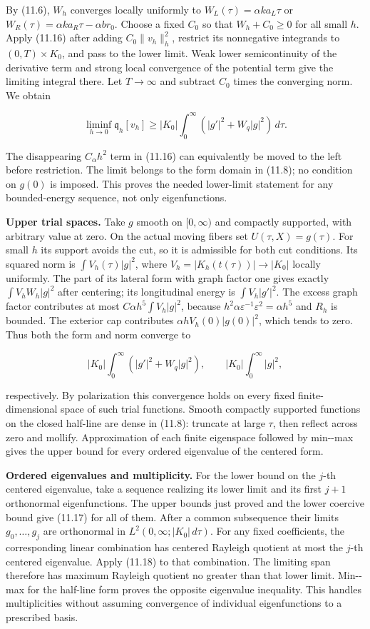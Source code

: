 \documentclass[11pt]{article}
\begin{document}
By (11.6), \(W_h\) converges locally uniformly to
\(W_L(\tau)=\alpha k a_L\tau\) or
\(W_R(\tau)=\alpha k a_R\tau-\alpha br_0\). Choose a fixed \(C_0\) so
that \(W_h+C_0\ge0\) for all small \(h\). Apply (11.16) after adding
\(C_0\|v_h\|_h^2\), restrict its nonnegative integrands to
\((0,T)\times K_0\), and pass to the lower limit. Weak lower
semicontinuity of the derivative term and strong local convergence of
the potential term give the limiting integral there. Let \(T\to\infty\)
and subtract \(C_0\) times the converging norm. We obtain

\[
\liminf_{h\to0}\mathfrak q_h[v_h]
\ge |K_0|\int_0^\infty(|g'|^2+W_q|g|^2)\,d\tau.
\tag{11.18}
\]

The disappearing \(C_\alpha h^2\) term in (11.16) can equivalently be
moved to the left before restriction. The limit belongs to the form
domain in (11.8); no condition on \(g(0)\) is imposed. This proves the
needed lower-limit statement for any bounded-energy sequence, not only
eigenfunctions.

\textbf{Upper trial spaces.} Take \(g\) smooth on \([0,\infty)\) and
compactly supported, with arbitrary value at zero. On the actual moving
fibers set \(U(\tau,X)=g(\tau)\). For small \(h\) its support avoids the
cut, so it is admissible for both cut conditions. Its squared norm is
\(\int V_h(\tau)|g|^2\), where \(V_h=|K_h(t(\tau))|\to|K_0|\) locally
uniformly. The part of its lateral form with graph factor one gives
exactly \(\int V_h W_h|g|^2\) after centering; its longitudinal energy
is \(\int V_h|g'|^2\). The excess graph factor contributes at most
\(C\alpha h^5\int V_h|g|^2\), because
\(h^2\alpha\varepsilon^{-1}\varepsilon^2=\alpha h^5\) and \(R_h\) is
bounded. The exterior cap contributes \(\alpha h V_h(0)|g(0)|^2\), which
tends to zero. Thus both the form and norm converge to

\[
|K_0|\int_0^\infty(|g'|^2+W_q|g|^2),
\qquad |K_0|\int_0^\infty|g|^2,
\tag{11.19}
\]

respectively. By polarization this convergence holds on every fixed
finite-dimensional space of such trial functions. Smooth compactly
supported functions on the closed half-line are dense in (11.8):
truncate at large \(\tau\), then reflect across zero and mollify.
Approximation of each finite eigenspace followed by min-\/-max gives the
upper bound for every ordered eigenvalue of the centered form.

\textbf{Ordered eigenvalues and multiplicity.} For the lower bound on
the \(j\)-th centered eigenvalue, take a sequence realizing its lower
limit and its first \(j+1\) orthonormal eigenfunctions. The upper bounds
just proved and the lower coercive bound give (11.17) for all of them.
After a common subsequence their limits \(g_0,\ldots,g_j\) are
orthonormal in \(L^2(0,\infty;|K_0|\,d\tau)\). For any fixed
coefficients, the corresponding linear combination has centered Rayleigh
quotient at most the \(j\)-th centered eigenvalue. Apply (11.18) to that
combination. The limiting span therefore has maximum Rayleigh quotient
no greater than that lower limit. Min-\/-max for the half-line form
proves the opposite eigenvalue inequality. This handles multiplicities
without assuming convergence of individual eigenfunctions to a
prescribed basis.
\end{document}
